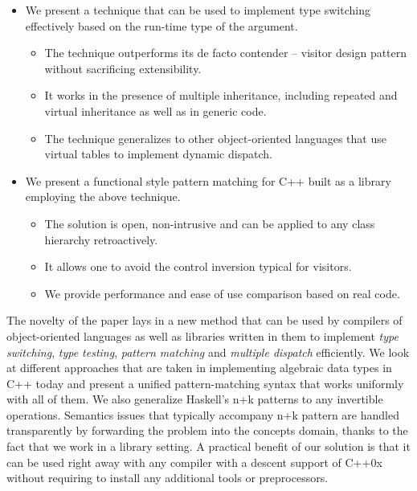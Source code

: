 \documentclass[preprint]{sigplanconf}
\begin{document}
\begin{itemize}
\item We present a technique that can be used to implement type switching 
      effectively based on the run-time type of the argument. 
  \begin{itemize}
  \item The technique outperforms its de facto contender -- visitor design 
        pattern without sacrificing extensibility.
  \item It works in the presence of multiple inheritance, including repeated and 
        virtual inheritance as well as in generic code.
  \item The technique generalizes to other object-oriented languages that use 
        virtual tables to implement dynamic dispatch.
  \end{itemize}
\item We present a functional style pattern matching for C++ built as a library 
      employing the above technique.
  \begin{itemize}
  \item The solution is open, non-intrusive and can be applied to any class 
        hierarchy retroactively.
  \item It allows one to avoid the control inversion typical for visitors.
  \item We provide performance and ease of use comparison based on real code.
  \end{itemize}
\end{itemize}

The novelty of the paper lays in a new method that can be used by compilers of 
object-oriented languages as well as libraries written in them to implement 
\emph{type switching}, \emph{type testing}, \emph{pattern matching} and 
\emph{multiple dispatch} efficiently. We look at different approaches that are 
taken in implementing algebraic data types in C++ today and present a unified 
pattern-matching syntax that works uniformly with all of them. We also 
generalize Haskell's n+k patterns\cite{haskell98} to any invertible operations. 
Semantics issues that typically accompany n+k pattern are handled transparently 
by forwarding the problem into the concepts domain, thanks to the fact that we 
work in a library setting. A practical benefit of our solution is that it can be 
used right away with any compiler with a descent support of C++0x without 
requiring to install any additional tools or preprocessors.
\end{document}
